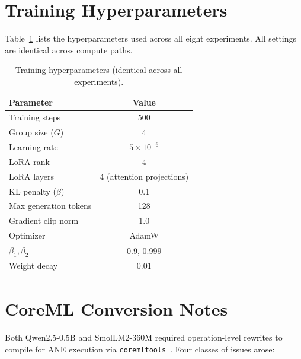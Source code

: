 \documentclass[11pt]{article}
\begin{document}
\appendix

\section{Training Hyperparameters}
\label{app:hyperparams}

Table~\ref{tab:hyperparams} lists the hyperparameters used across all eight experiments.  All settings are identical across compute paths.

\begin{table}[ht]
\centering
\caption{Training hyperparameters (identical across all experiments).}
\label{tab:hyperparams}
\begin{tabular}{lc}
\toprule
\textbf{Parameter} & \textbf{Value} \\
\midrule
Training steps & 500 \\
Group size ($G$) & 4 \\
Learning rate & $5 \times 10^{-6}$ \\
LoRA rank & 4 \\
LoRA layers & 4 (attention projections) \\
KL penalty ($\beta$) & 0.1 \\
Max generation tokens & 128 \\
Gradient clip norm & 1.0 \\
Optimizer & AdamW \\
$\beta_1, \beta_2$ & 0.9, 0.999 \\
Weight decay & 0.01 \\
\bottomrule
\end{tabular}
\end{table}

\section{CoreML Conversion Notes}
\label{app:coreml}

Both Qwen2.5-0.5B and SmolLM2-360M required operation-level rewrites to compile for ANE execution via \texttt{coremltools}~\cite{apple2023coremltools}.  Four classes of issues arose:
\end{document}

